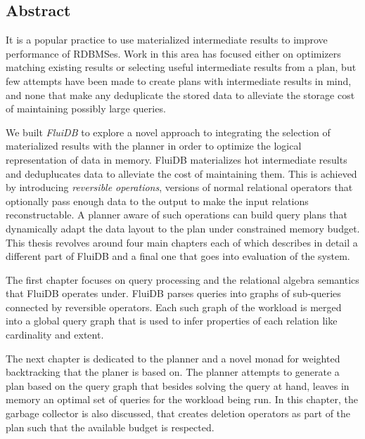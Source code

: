 \setcounter{page}{1}%

\maketitle%

\begin{precontent}

\chapter{Abstract}%
It is a popular practice to use materialized intermediate results to
improve performance of RDBMSes. Work in this area has focused either on
optimizers matching existing results or selecting useful intermediate
results from a plan, but few attempts have been made to create plans
with intermediate results in mind, and none that make any deduplicate
the stored data to alleviate the storage cost of maintaining possibly
large queries.

We built \emph{FluiDB} to explore a novel approach to integrating the
selection of materialized results with the planner in order to
optimize the logical representation of data in memory. FluiDB
materializes hot intermediate results and deduplucates data to
alleviate the cost of maintaining them. This is achieved by
introducing \emph{reversible operations}, versions of normal relational
operators that optionally pass enough data to the output to make the
input relations reconstructable. A planner aware of such operations
can build query plans that dynamically adapt the data layout to the
plan under constrained memory budget. This thesis revolves around four
main chapters each of which describes in detail a different part of
FluiDB and a final one that goes into evaluation of the system.

The first chapter focuses on query processing and the relational
algebra semantics that FluiDB operates under. FluiDB parses queries
into graphs of sub-queries connected by reversible operators. Each
such graph of the workload is merged into a global query graph that is
used to infer properties of each relation like cardinality and
extent.

The next chapter is dedicated to the planner and a novel monad for
weighted backtracking that the planer is based on. The planner
attempts to generate a plan based on the query graph that besides
solving the query at hand, leaves in memory an optimal set of queries
for the workload being run. In this chapter, the garbage collector is
also discussed, that creates deletion operators as part of the plan
such that the available budget is respected.


\end{precontent}
